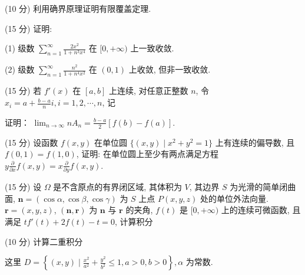 (10 分) 利用确界原理证明有限覆盖定理.\par
\par{}
(15 分) 证明:\par
(1) 级数 $\sum_{n=1}^{\infty} \frac{2x^2}{1 + n^3x^4}$ 在 $[0, +\infty)$ 上一致收敛.\par
(2) 级数 $\sum_{n=1}^{\infty} \frac{n^2}{1 + n^4 x^2}$ 在 $(0,1)$ 上收敛, 但非一致收敛.\par
\par{}
\par{}
(15 分) 若 $f'(x)$ 在 $[a, b]$ 上连续, 对任意正整数 $n$, 令 $x_i = a + \frac{b - a}{n} i, i = 1, 2, \cdots, n$, 记\par
\nopagebreak[4]
证明： $\lim_{n\to \infty}nA_n = \frac{b - a}{2} [f(b) - f(a)].$\par
\par{}
(15 分) 设函数 $f(x, y)$ 在单位圆 $\{(x, y) \mid x^2 + y^2 = 1\}$ 上有连续的偏导数, 且 $f(0, 1) = f(1, 0)$, 证明: 在单位圆上至少有两点满足方程 $y \frac{\partial}{\partial x} f(x, y) = x \frac{\partial}{\partial y} f(x, y)$.\par
\par{}
\par{}
(15 分) 设 $\Omega$ 是不含原点的有界闭区域, 其体积为 $V$, 其边界 $S$ 为光滑的简单闭曲面, $\boldsymbol{n} = (\cos \alpha, \cos \beta, \cos \gamma)$ 为 $S$ 上点 $P(x, y, z)$ 处的单位外法向量. $\boldsymbol{r} = (x, y, z)$, $(\boldsymbol{n}, \boldsymbol{r})$ 为 $\boldsymbol{n}$ 与 $\boldsymbol{r}$ 的夹角, $f(t)$ 是 $[0, +\infty)$ 上的连续可微函数, 且满足 $tf'(t) + 2f(t) - t = 0$, 计算积分\par
\nopagebreak[4]
\par{}
\par{}
(10 分) 计算二重积分\par
\nopagebreak[4]
这里 $D = \left\{(x,y)\mid \frac{x^2}{a^2} +\frac{y^2}{b^2}\leq 1,a > 0,b > 0\right\} ,\alpha$ 为常数.\par
